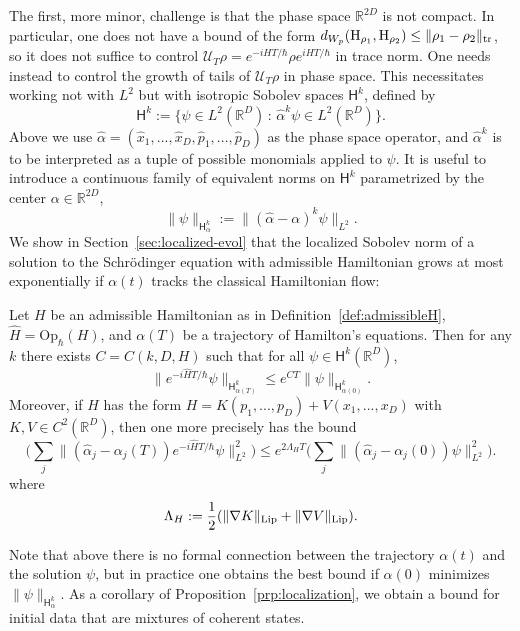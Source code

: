 \documentclass[11pt]{amsart}
\def\Husimi{{\mathrm{H}}}
\def\Sobolev{{\mathsf{H}}}
\def\balpha{\alpha}
\def\Op{\mathrm{Op}}
\def\Real{{\mathbb R}}
\newcommand{\mcal}[1]{{\mathcal{#1}}}
\numberwithin{equation}{section}
\begin{document}
The first, more minor, challenge is that the phase space $\Real^{2D}$ is not compact.
In particular, one does not have a bound of the form $d_{W_p}(\Husimi_{\rho_1}, \Husimi_{\rho_2})
\leq \|\rho_1-\rho_2\|_{\rm tr}$, so it does not suffice to control $\mcal{U}_T \rho = e^{- i H T/\hbar} \rho e^{i H T/\hbar}$ in trace norm.  One needs instead to control the growth
of tails of $\mcal{U}_T \rho$ in phase space.
This necessitates working not with $L^2$ but with isotropic Sobolev spaces
$\Sobolev^k$, defined by
\[
\Sobolev^k := \{\psi\in L^2(\Real^D) \,:\,
\hat{\balpha}^k \psi\in L^2(\Real^D)\}.
\]
Above we use $\hat{\balpha}=(\hat{x}_1,...,\hat{x}_D,\hat{p}_1,...,\hat{p}_D)$
as the phase space operator, and $\hat{\alpha}^k$ is to be interpreted as a
tuple of possible monomials applied to $\psi$.  It is useful to introduce a continuous family of equivalent norms on $\Sobolev^k$ parametrized by the center $\balpha\in\Real^{2D}$,
\[
\|\psi\|_{\Sobolev_\balpha^k} := \|(\hat{\balpha}-\balpha)^k\psi\|_{L^2}.
\]
We show in Section~\ref{sec:localized-evol} that the localized Sobolev norm of a solution to the Schr\"{o}dinger equation with admissible Hamiltonian grows at most
exponentially if $\balpha(t)$ tracks the classical Hamiltonian flow:

\begin{proposition}
\label{prp:localization}
Let $H$ be an admissible Hamiltonian as in Definition~\ref{def:admissibleH},
$\hat{H}=\Op_\hbar(H)$, and $\balpha(T)$ be a trajectory of Hamilton's equations.  Then for any $k$ there exists $C=C(k,D,H)$
such that for all $\psi\in \Sobolev^k(\Real^D)$,
\begin{equation}
\label{eq:general-bd}
\|e^{-i\hat{H}T/\hbar} \psi\|_{\Sobolev^k_{\balpha(T)}}
\leq e^{CT}\|\psi\|_{\Sobolev^k_{\balpha(0)}}.
\end{equation}
Moreover, if $H$ has the form $H = K(p_1,...,p_D) + V(x_1,...,x_D)$ with $K,V\in C^{2}(\Real^D)$, then one more precisely has the bound
\begin{equation}
\label{eq:meanfield-bd}
\Big(\sum_j \|(\hat{\balpha}_j -\balpha_j(T)) e^{-i\hat{H}T/\hbar}\psi\|_{L^2}^2 \Big)
\leq e^{2\Lambda_H T}
\Big(\sum_j \|(\hat{\balpha}_j -\balpha_j(0)) \psi\|_{L^2}^2 \Big).
\end{equation}
where
\[
\Lambda_H := \frac12 (\|\nabla K\|_{\rm Lip} + \|\nabla V\|_{\rm Lip}).
\]
\end{proposition}

Note that above there is no formal connection between the trajectory $\balpha(t)$
and the solution $\psi$, but in practice one obtains the best bound if $\balpha(0)$
minimizes $\|\psi\|_{\Sobolev^k_\balpha}$.
As a corollary of Proposition~\ref{prp:localization}, we obtain a bound for initial data that are mixtures of coherent states.
\end{document}
